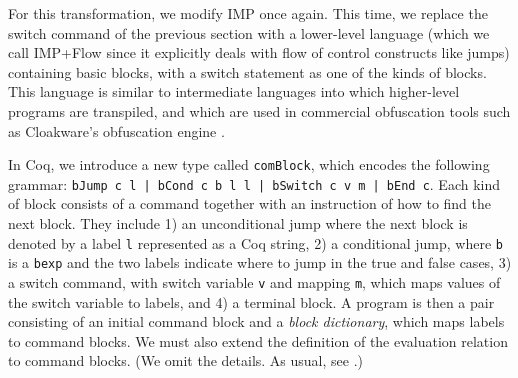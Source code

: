 \documentclass[compsoc,conference,a4paper,10pt,times]{IEEEtran}
\begin{document}

For this transformation, we modify IMP once again.  This time, we replace the switch command of the previous section with a lower-level language (which we call IMP+Flow since it explicitly deals with flow of control constructs like jumps) containing basic blocks, with a switch statement as one of the kinds of blocks.
This language is similar to intermediate languages into which higher-level programs are transpiled, and which are used in commercial obfuscation tools such as Cloakware's obfuscation engine \cite{Cloakware}.

In Coq, we introduce a new type called \texttt{comBlock}, which encodes the following grammar: 
\texttt{bJump c l | bCond c b l l | bSwitch c v m | bEnd c}. 
Each kind of block consists of a command together with an instruction of how to find the next block.
They include 1) an unconditional jump where the next block is denoted by a label \texttt{l} represented as a Coq string, 2) a conditional jump, where \texttt{b} is a \texttt{bexp} and the two labels indicate where to jump in the true and false cases, 3) a switch command, with switch variable \texttt{v} and mapping \texttt{m}, which maps values of the switch variable to labels, and 4) a terminal block.  A program is then a pair consisting of an initial command block and a \emph{block dictionary}, which maps labels to command blocks.  We must also extend the definition of the evaluation relation to command blocks.  (We omit the details. As usual, see \cite{Weiyun,WeiRepo}.)

\end{document}
